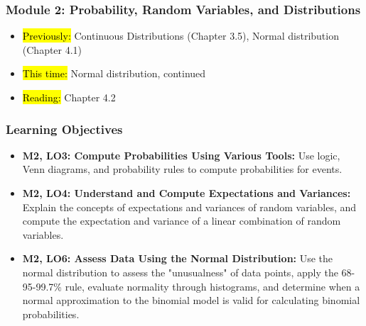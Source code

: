 
\begin{frame}
    \frametitle{Module 2: Probability, Random Variables, and Distributions}
    \begin{itemize}
        \item \hl{Previously: }Continuous Distributions (Chapter 3.5), Normal distribution (Chapter 4.1)
        \item \hl{This time: }Normal distribution, continued
        \item \hl{Reading: }Chapter 4.2
    \end{itemize}

\end{frame}
\begin{frame}
    \frametitle{Learning Objectives}
    \begin{itemize}
        \item \textbf{M2, LO3: Compute Probabilities Using Various Tools:} Use logic, Venn diagrams, and probability rules to compute probabilities for events.
        \item \textbf{M2, LO4: Understand and Compute Expectations and Variances:} Explain the concepts of expectations and variances of random variables, and compute the expectation and variance of a linear combination of random variables.
        \item \textbf{M2, LO6: Assess Data Using the Normal Distribution:} Use the normal distribution to assess the "unusualness" of data points, apply the 68-95-99.7\% rule, evaluate normality through histograms, and determine when a normal approximation to the binomial model is valid for calculating binomial probabilities.
    \end{itemize}
\end{frame}
